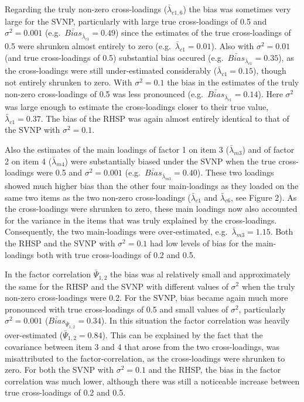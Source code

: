 \documentclass[
  man, donotrepeattitle,floatsintext]{apa6}
\begin{document}
Regarding the truly non-zero cross-loadings (\(\bar{\lambda}_{c 1, 6}\)) the bias was sometimes very large for the SVNP, particularly with large true cross-loadings of 0.5 and \(\sigma^2 = 0.001\) (e.g.~\(\bar{Bias}_{\bar{\lambda}_{c 1}} = 0.49\)) since the estimates of the true cross-loadings of 0.5 were shrunken almost entirely to zero (e.g.~\(\bar{\lambda}_{c 1} = 0.01\)). Also with \(\sigma^2 = 0.01\) (and true cross-loadings of 0.5) substantial bias occured (e.g.~\(\bar{Bias}_{\bar{\lambda}_{c 1}} = 0.35\)), as the cross-loadings were still under-estimated considerably (\(\bar{\lambda}_{c 1} = 0.15\)), though not entirely shrunken to zero. With \(\sigma^2 = 0.1\) the bias in the estimates of the truly non-zero cross-loadings of 0.5 was less pronounced (e.g.~\(\bar{Bias}_{\bar{\lambda}_{c 1}} = 0.14\)). Here \(\sigma^2\) was large enough to estimate the cross-loadings closer to their true value, \(\bar{\lambda}_{c 1} = 0.37\). The bias of the RHSP was again almost entirely identical to that of the SVNP with \(\sigma^2 = 0.1\).

Also the estimates of the main loadings of factor 1 on item 3 (\(\bar{\lambda}_{m 3}\)) and of factor 2 on item 4 (\(\bar{\lambda}_{m 4}\)) were substantially biased under the SVNP when the true cross-loadings were 0.5 and \(\sigma^2 = 0.001\) (e.g.~\(\bar{Bias}_{\bar{\lambda}_{m 3}} = 0.40\)). These two loadings showed much higher bias than the other four main-loadings as they loaded on the same two items as the two non-zero cross-loadings (\(\bar{\lambda}_{c 1}\) and \(\bar{\lambda}_{c 6}\), see Figure 2). As the cross-loadings were shrunken to zero, these main loadings now also accounted for the variance in the items that was truly explained by the cross-loadings. Consequently, the two main-loadings were over-estimated, e.g.~\(\bar{\lambda}_{m 3} = 1.15\). Both the RHSP and the SVNP with \(\sigma^2 = 0.1\) had low levels of bias for the main-loadings both with true cross-loadings of 0.2 and 0.5.

In the factor correlation \(\bar{\Psi}_{1,2}\) the bias was al relatively small and approximately the same for the RHSP and the SVNP with different values of \(\sigma^2\) when the truly non-zero cross-loadings were 0.2. For the SVNP, bias became again much more pronounced with true cross-loadings of 0.5 and small values of \(\sigma^2\), particularly \(\sigma^2 = 0.001\) (\(\bar{Bias}_{\bar{\Psi}_{1,2}} = 0.34\)). In this situation the factor correlation was heavily over-estimated (\(\bar{\Psi}_{1,2} = 0.84\)). This can be explained by the fact that the covariance between item 3 and 4 that arose from the two cross-loadings, was misattributed to the factor-correlation, as the cross-loadings were shrunken to zero. For both the SVNP with \(\sigma^2 = 0.1\) and the RHSP, the bias in the factor correlation was much lower, although there was still a noticeable increase between true cross-loadings of 0.2 and 0.5.
\end{document}
